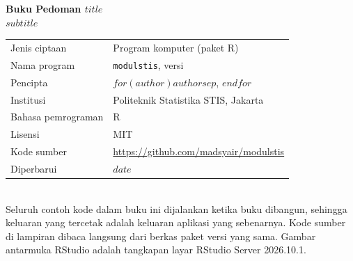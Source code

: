 \thispagestyle{empty}
\vspace*{\fill}
{\small\color{abuteks}
\textbf{\color{bpsnavy}Buku Pedoman $title$}\\
$subtitle$\\[8pt]
\begin{tabular}{@{}ll@{}}
Jenis ciptaan & Program komputer (paket R)\\
Nama program & \texttt{modulstis}, versi \versimodulstis{}\\
Pencipta & $for(author)$$author$$sep$, $endfor$\\
Institusi & Politeknik Statistika STIS, Jakarta\\
Bahasa pemrograman & R\\
Lisensi & MIT\\
Kode sumber & \url{https://github.com/madsyair/modulstis}\\
Diperbarui & $date$\\
\end{tabular}\\[10pt]
Seluruh contoh kode dalam buku ini dijalankan ketika buku dibangun, sehingga keluaran yang
tercetak adalah keluaran aplikasi yang sebenarnya. Kode sumber di lampiran dibaca langsung dari
berkas paket versi yang sama. Gambar antarmuka RStudio adalah tangkapan layar RStudio Server
2026.10.1.\par}
\clearpage

